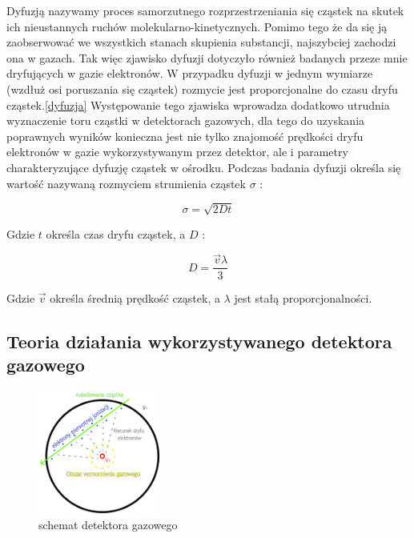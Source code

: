 \documentclass[10pt,a4paper]{article}
\begin{document}
Dyfuzją nazywamy proces samorzutnego rozprzestrzeniania się cząstek na skutek ich nieustannych ruchów molekularno-kinetycznych. Pomimo tego że da się ją zaobserwować we wszystkich stanach skupienia substancji, najszybciej zachodzi ona w gazach. Tak więc zjawisko dyfuzji dotyczyło również badanych przeze mnie dryfujących w gazie elektronów. W przypadku dyfuzji w jednym wymiarze (wzdłuż osi poruszania się cząstek) rozmycie jest proporcjonalne do czasu dryfu cząstek.\ref{dyfuzja} Występowanie tego zjawiska wprowadza dodatkowo utrudnia wyznaczenie toru cząstki w detektorach gazowych, dla tego do uzyskania poprawnych wyników konieczna jest nie tylko znajomość prędkości dryfu elektronów w gazie wykorzystywanym przez detektor, ale i parametry charakteryzujące dyfuzję cząstek w ośrodku. Podczas badania dyfuzji określa się wartość nazywaną rozmyciem strumienia cząstek $\sigma$ \cite{dyfuzja}:

\begin{equation*}
    \sigma = \sqrt{2Dt}
\end{equation*}

Gdzie $t$ określa czas dryfu cząstek, a $D$ \cite{opracowanie}:

\begin{equation*}
    D = \frac{\vec{v}\lambda}{3}
\end{equation*}

Gdzie $\vec{v}$ określa średnią prędkość cząstek, a $\lambda$ jest stałą proporcjonalności.

\subsection{Teoria działania wykorzystywanego detektora gazowego}

\begin{figure}
    \centering
    \includegraphics[width=4cm]{diagrams/detektor.pdf}
    \caption{schemat detektora gazowego}
    \label{detektor}
\end{figure}
\end{document}
